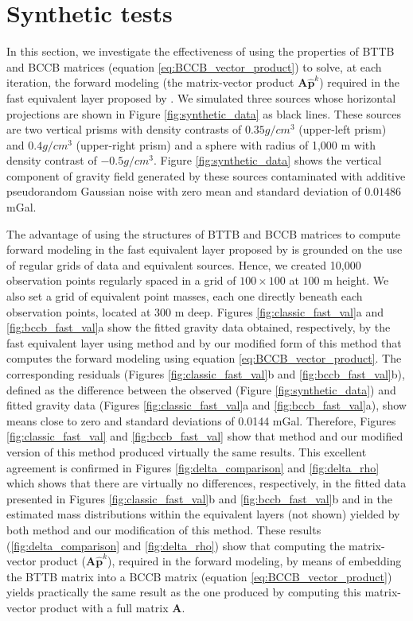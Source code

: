 \documentclass[manuscript,revised]{geophysics}
\begin{document}
\section{Synthetic tests}
In this section, we  investigate the effectiveness of using the properties of BTTB and BCCB matrices (equation \ref{eq:BCCB_vector_product})  to solve, at each iteration, the forward modeling (the matrix-vector product $\mathbf{A} \hat{\mathbf{p}}^k$)  required in the fast equivalent layer proposed by \citet{siqueira-etal2017}.  We simulated three sources whose horizontal projections are shown in Figure \ref{fig:synthetic_data} as black lines.  These sources are two vertical prisms with density contrasts of $0.35 g/cm^3$ (upper-left prism) and $0.4 g/cm^3$ (upper-right prism) and a sphere with radius of 1,000 m with density contrast of $-0.5 g/cm^3$. Figure \ref{fig:synthetic_data}  shows the vertical component of gravity field generated by these sources contaminated with additive pseudorandom Gaussian noise with zero mean and standard deviation of $0.01486$ mGal.
 
The advantage of using the structures of BTTB and BCCB matrices to compute forward modeling in  the fast equivalent layer proposed by \citet{siqueira-etal2017} is grounded on the use of regular grids of data and equivalent sources. Hence, we created 10,000 observation points regularly spaced in a grid of $100 \times 100$ at $100$ m height. We also set a grid of equivalent point masses, each one directly beneath each observation points, located at $300$ m deep.  Figures \ref{fig:classic_fast_val}a and \ref{fig:bccb_fast_val}a  show the fitted gravity data obtained, respectively, by the fast equivalent layer using \citet{siqueira-etal2017} method and by our modified form of this method that computes the forward modeling using equation \ref{eq:BCCB_vector_product}. The corresponding residuals (Figures \ref{fig:classic_fast_val}b and \ref{fig:bccb_fast_val}b), defined as the difference between the observed (Figure  \ref{fig:synthetic_data}) and fitted gravity data (Figures \ref{fig:classic_fast_val}a and \ref{fig:bccb_fast_val}a), show means close to zero  and standard deviations of 0.0144 mGal.  Therefore, Figures \ref{fig:classic_fast_val} and \ref{fig:bccb_fast_val} show that \citet{siqueira-etal2017} method and our modified version of this method produced virtually the same results. This excellent agreement is confirmed in Figures \ref{fig:delta_comparison} and \ref{fig:delta_rho} which shows that there are virtually no differences, respectively,  in the fitted data presented in Figures \ref{fig:classic_fast_val}b and \ref{fig:bccb_fast_val}b and in the estimated mass distributions within the equivalent layers (not shown) yielded by both \citet{siqueira-etal2017} method and our modification of this method.  These results (\ref{fig:delta_comparison} and \ref{fig:delta_rho})  show that computing the matrix-vector product ($\mathbf{A} \hat{\mathbf{p}}^k$), required in the forward modeling, by means of embedding the BTTB matrix into a BCCB matrix (equation \ref{eq:BCCB_vector_product}) yields practically the same result as the one produced by computing this matrix-vector product  with a full matrix $\mathbf{A}$.
\end{document}
